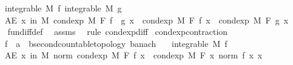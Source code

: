 \begin{isabellebody}
\ \ \ {\isachardoublequoteopen}integrable\ M\ f{\isachardoublequoteclose}\ {\isachardoublequoteopen}integrable\ M\ g{\isachardoublequoteclose}\isanewline
\ \ \ {\isachardoublequoteopen}AE\ x\ in\ M{\isachardot}{\kern0pt}\ cond{\isacharunderscore}{\kern0pt}exp\ M\ F\ {\isacharparenleft}{\kern0pt}f\ {\isacharminus}{\kern0pt}\ g{\isacharparenright}{\kern0pt}\ x\ {\isacharequal}{\kern0pt}\ cond{\isacharunderscore}{\kern0pt}exp\ M\ F\ f\ x\ {\isacharminus}{\kern0pt}\ cond{\isacharunderscore}{\kern0pt}exp\ M\ F\ g\ x{\isachardoublequoteclose}\isanewline
%
\isadelimproof
\ \ %
\endisadelimproof
%
\isatagproof
{}\isamarkupfalse%
\ fun{\isacharunderscore}{\kern0pt}diff{\isacharunderscore}{\kern0pt}def\ \isamarkupfalse%
\ assms\ \isamarkupfalse%
\ {\isacharparenleft}{\kern0pt}rule\ cond{\isacharunderscore}{\kern0pt}exp{\isacharunderscore}{\kern0pt}diff{\isacharparenright}{\kern0pt}%
\endisatagproof
{\isafoldproof}%
%
\isadelimproof
\isanewline
%
\endisadelimproof
\isanewline
{}\isamarkupfalse%
\ cond{\isacharunderscore}{\kern0pt}exp{\isacharunderscore}{\kern0pt}contraction{\isacharcolon}{\kern0pt}\isanewline
\ \ \ f\ {\isacharcolon}{\kern0pt}{\isacharcolon}{\kern0pt}\ {\isachardoublequoteopen}{\isacharprime}{\kern0pt}a\ {\isasymRightarrow}\ {\isacharprime}{\kern0pt}b{\isacharcolon}{\kern0pt}{\isacharcolon}{\kern0pt}{\isacharbraceleft}{\kern0pt}second{\isacharunderscore}{\kern0pt}countable{\isacharunderscore}{\kern0pt}topology{\isacharcomma}{\kern0pt}\ banach{\isacharbraceright}{\kern0pt}{\isachardoublequoteclose}\isanewline
\ \ \ {\isachardoublequoteopen}integrable\ M\ f{\isachardoublequoteclose}\isanewline
\ \ \ {\isachardoublequoteopen}AE\ x\ in\ M{\isachardot}{\kern0pt}\ norm\ {\isacharparenleft}{\kern0pt}cond{\isacharunderscore}{\kern0pt}exp\ M\ F\ f\ x{\isacharparenright}{\kern0pt}\ {\isasymle}\ cond{\isacharunderscore}{\kern0pt}exp\ M\ F\ {\isacharparenleft}{\kern0pt}{\isasymlambda}x{\isachardot}{\kern0pt}\ norm\ {\isacharparenleft}{\kern0pt}f\ x{\isacharparenright}{\kern0pt}{\isacharparenright}{\kern0pt}\ x{\isachardoublequoteclose}\ \isanewline
%
\isadelimproof
%
\endisadelimproof
%
\isatagproof
{}\isamarkupfalse%
\ {\isacharminus}{\kern0pt}\isanewline
\ \ \isamarkupfalse%

\end{isabellebody}
